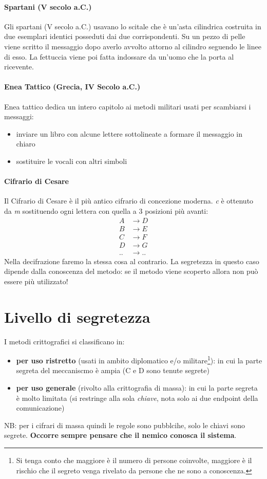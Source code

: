 \paragraph{Spartani (V secolo a.C.)} Gli spartani (V secolo a.C.) usavano lo scitale che è un'asta cilindrica costruita in due esemplari identici posseduti dai due corrispondenti. Su un pezzo di pelle viene scritto il messaggio dopo averlo avvolto attorno al cilindro seguendo le linee di esso. La fettuccia viene poi fatta indossare da un'uomo che la porta al ricevente.

\paragraph{Enea Tattico (Grecia, IV Secolo a.C.)} Enea tattico dedica un intero capitolo ai metodi militari usati per scambiarsi i messaggi:
\begin{itemize}
    \item inviare un libro con alcune lettere sottolineate a formare il messaggio in chiaro
    \item sostituire le vocali con altri simboli
\end{itemize}

\paragraph{Cifrario di Cesare} Il Cifrario di Cesare è il più antico cifrario di concezione moderna. \emph{c} è ottenuto da \emph{m} sostituendo ogni lettera con quella a 3 posizioni più avanti:
\begin{align*}
	A &\longrightarrow D \\
	B &\longrightarrow E \\
	C &\longrightarrow F \\
	D &\longrightarrow G\\
	.. &\longrightarrow ..
\end{align*}
Nella decifrazione faremo la stessa cosa al contrario. La segretezza in questo caso dipende dalla conoscenza del metodo: se il metodo viene scoperto allora non può essere più utilizzato!

\section{Livello di segretezza}
I metodi crittografici si classificano in:
\begin{itemize}
    \item \textbf{per uso ristretto} (usati in ambito diplomatico e/o militare\footnote{Si tenga conto che maggiore è il numero di persone coinvolte, maggiore è il rischio che il segreto venga rivelato da persone che ne sono a conoscenza. }): in cui la parte segreta del meccaniscmo è ampia (C e D sono tenute segrete)
    \item \textbf{per uso generale} (rivolto alla crittografia di massa): in cui la parte segreta è molto limitata (si restringe alla sola \emph{chiave}, nota solo ai due endpoint della comunicazione)
\end{itemize}
NB: per i cifrari di massa quindi le regole sono pubblcihe, solo le chiavi sono segrete. \textbf{Occorre sempre pensare che il nemico conosca il sistema}. 

